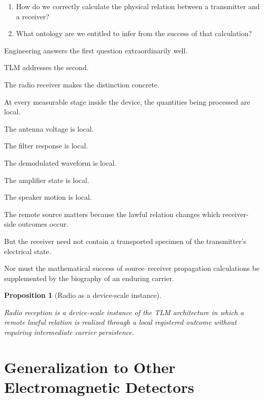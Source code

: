 \documentclass[12pt,onecolumn]{article}
\newtheorem{proposition}{Proposition}[section]
\begin{document}
\begin{enumerate}

\item How do we correctly calculate the physical relation between a
transmitter and a receiver?

\item What ontology are we entitled to infer from the success of that
calculation?

\end{enumerate}

Engineering answers the first question extraordinarily well.

TLM addresses the second.

The radio receiver makes the distinction concrete.

At every measurable stage inside the device, the quantities being
processed are local.

The antenna voltage is local.

The filter response is local.

The demodulated waveform is local.

The amplifier state is local.

The speaker motion is local.

The remote source matters because the lawful relation changes which
receiver-side outcomes occur.

But the receiver need not contain a transported specimen of the
transmitter's electrical state.

Nor must the mathematical success of source--receiver propagation
calculations be supplemented by the biography of an enduring carrier.

\begin{proposition}[Radio as a device-scale instance]
\label{prop:device}

Radio reception is a device-scale instance of the TLM architecture in
which a remote lawful relation is realized through a local registered
outcome without requiring intermediate carrier persistence.

\end{proposition}

\section{Generalization to Other Electromagnetic Detectors}
\end{document}
